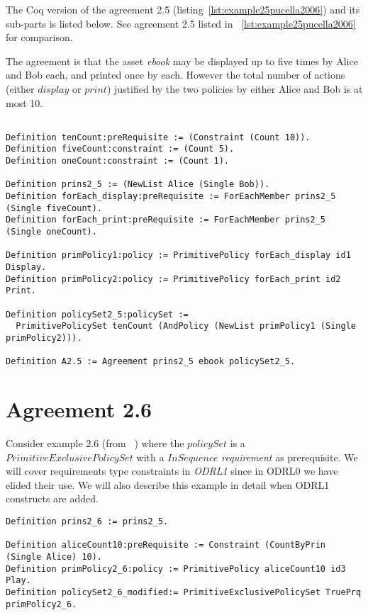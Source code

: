 The Coq version of the agreement 2.5 (listing~\ref{lst:example25pucella2006}) and its sub-parts is listed below. See agreement 2.5 listed in ~\ref{lst:example25pucella2006} for comparison.

The agreement is that the asset \emph{ebook} may be displayed up to five times by Alice and Bob each, and printed once by each. However the total number of actions (either $display$ or $print$) justified by the two policies by either Alice and Bob is at most 10.


\lstset{language=Coq}
\begin{lstlisting}[frame=single, caption={Example 2.5},label={lst:example25}]

Definition tenCount:preRequisite := (Constraint (Count 10)).
Definition fiveCount:constraint := (Count 5).
Definition oneCount:constraint := (Count 1).

Definition prins2_5 := (NewList Alice (Single Bob)).
Definition forEach_display:preRequisite := ForEachMember prins2_5 (Single fiveCount).
Definition forEach_print:preRequisite := ForEachMember prins2_5 (Single oneCount).

Definition primPolicy1:policy := PrimitivePolicy forEach_display id1 Display.
Definition primPolicy2:policy := PrimitivePolicy forEach_print id2 Print.

Definition policySet2_5:policySet :=
  PrimitivePolicySet tenCount (AndPolicy (NewList primPolicy1 (Single primPolicy2))).
                     
Definition A2.5 := Agreement prins2_5 ebook policySet2_5.

\end{lstlisting}

\section{Agreement 2.6}

Consider example 2.6 (from ~\cite{pucella2006}) where the $policySet$ is a $PrimitiveExclusivePolicySet$ with a $InSequence$ \emph{requirement} as prerequisite. We will cover requirements type constraints in \emph{ODRL1} since in ODRL0 we have elided their use. We will also describe this example in detail when ODRL1 constructs are added.

 
\lstset{language=Coq}
\begin{lstlisting}[frame=single, caption={Example 2.6},label={lst:example26}]
Definition prins2_6 := prins2_5.

Definition aliceCount10:preRequisite := Constraint (CountByPrin (Single Alice) 10).
Definition primPolicy2_6:policy := PrimitivePolicy aliceCount10 id3 Play.
Definition policySet2_6_modified:= PrimitiveExclusivePolicySet TruePrq primPolicy2_6.
\end{lstlisting}





